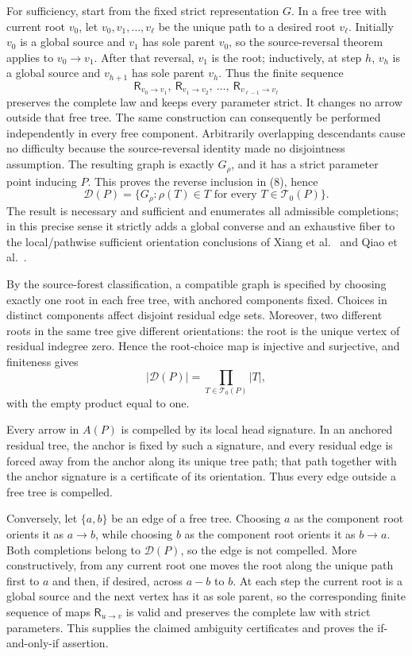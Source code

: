 For sufficiency, start from the fixed strict representation \(G\).  In a free tree with current root \(v_0\), let
\(v_0,v_1,\ldots,v_\ell\) be the unique path to a desired root \(v_\ell\).  Initially \(v_0\) is a global source and \(v_1\) has sole parent \(v_0\), so the source-reversal theorem applies to \(v_0\to v_1\).  After that reversal, \(v_1\) is the root; inductively, at step \(h\), \(v_h\) is a global source and \(v_{h+1}\) has sole parent \(v_h\).  Thus the finite sequence
\[
 \mathsf R_{v_0\to v_1},\ 
 \mathsf R_{v_1\to v_2},\ \ldots,\ 
 \mathsf R_{v_{\ell-1}\to v_\ell}
\]
preserves the complete law and keeps every parameter strict.  It changes no arrow outside that free tree.  The same construction can consequently be performed independently in every free component.  Arbitrarily overlapping descendants cause no difficulty because the source-reversal identity made no disjointness assumption.  The resulting graph is exactly \(G_\rho\), and it has a strict parameter point inducing \(P\).  This proves the reverse inclusion in (8), hence
\[
 \mathcal D(P)=
 \{G_\rho:\rho(T)\in T\text{ for every }T\in\mathcal T_0(P)\}.
\]
The result is necessary and sufficient and enumerates all admissible completions; in this precise sense it strictly adds a global converse and an exhaustive fiber to the local/pathwise sufficient orientation conclusions of Xiang et al.\ \cite[Theorem~7]{xiang2024identifiability} and Qiao et al.\ \cite[Theorem~7]{qiao2024causal}.

By the source-forest classification, a compatible graph is specified by choosing exactly one root in each free tree, with anchored components fixed.  Choices in distinct components affect disjoint residual edge sets.  Moreover, two different roots in the same tree give different orientations: the root is the unique vertex of residual indegree zero.  Hence the root-choice map is injective and surjective, and finiteness gives
\[
 |\mathcal D(P)|=\prod_{T\in\mathcal T_0(P)}|T|,
\]
with the empty product equal to one.

Every arrow in \(A(P)\) is compelled by its local head signature.  In an anchored residual tree, the anchor is fixed by such a signature, and every residual edge is forced away from the anchor along its unique tree path; that path together with the anchor signature is a certificate of its orientation.  Thus every edge outside a free tree is compelled.

Conversely, let \(\{a,b\}\) be an edge of a free tree.  Choosing \(a\) as the component root orients it as \(a\to b\), while choosing \(b\) as the component root orients it as \(b\to a\).  Both completions belong to \(\mathcal D(P)\), so the edge is not compelled.  More constructively, from any current root one moves the root along the unique path first to \(a\) and then, if desired, across \(a-b\) to \(b\).  At each step the current root is a global source and the next vertex has it as sole parent, so the corresponding finite sequence of maps \(\mathsf R_{u\to v}\) is valid and preserves the complete law with strict parameters.  This supplies the claimed ambiguity certificates and proves the if-and-only-if assertion.

